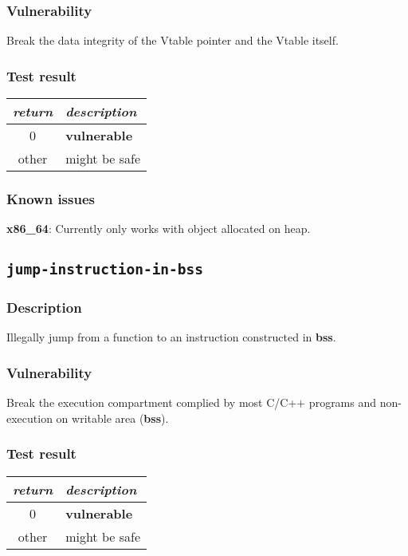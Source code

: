 \documentclass[a4paper]{book}
\begin{document}
\subsubsection{Vulnerability}
Break the data integrity of the Vtable pointer and the Vtable itself.

\subsubsection{Test result}
\begin{tabular}{cl}
  \toprule
  \emph{return}  & \emph{description} \\
  \midrule
  0              & \textbf{vulnerable} \\
  other          & might be safe \\
  \bottomrule
\end{tabular}

\subsubsection{Known issues}

\textbf{x86\_64}: Currently only works with object allocated on heap.
\newpage
\subsection{\texttt{jump-instruction-in-bss}}\label{test-jump-instruction-in-bss}

\subsubsection{Description}
Illegally jump from a function to an instruction constructed in \textbf{bss}.

\subsubsection{Vulnerability}
Break the execution compartment complied by most C/C++ programs and non-execution on writable area (\textbf{bss}).

\subsubsection{Test result}
\begin{tabular}{cl}
  \toprule
  \emph{return}  & \emph{description} \\
  \midrule
  0              & \textbf{vulnerable} \\
  other          & might be safe \\
  \bottomrule
\end{tabular}
  
\end{document}
